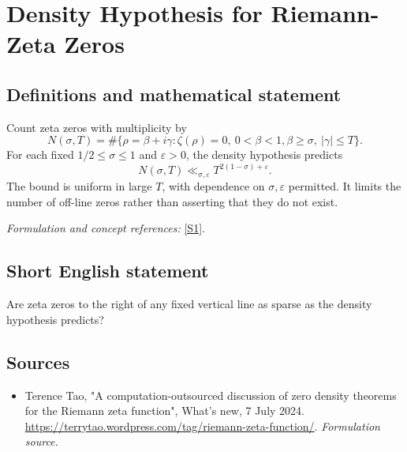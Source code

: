\documentclass[11pt]{article}
\begin{document}
\section*{\texorpdfstring{Density Hypothesis for Riemann-Zeta Zeros}{Density Hypothesis for Riemann-Zeta Zeros}}\label{30005276}
\subsection{Definitions and mathematical statement}
Count zeta zeros with multiplicity by
\[
 N(\sigma,T)=\#\{\rho=\beta+i\gamma:\zeta(\rho)=0,\ 0<\beta<1,
                                  \beta\ge\sigma,\ |\gamma|\le T\}.
\]
For each fixed $1/2\le\sigma\le1$ and $\varepsilon>0$, the density hypothesis predicts
\[
 N(\sigma,T)\ll_{\sigma,\varepsilon}T^{2(1-\sigma)+\varepsilon}.
\]
The bound is uniform in large $T$, with dependence on $\sigma,\varepsilon$ permitted. It limits the number of off-line zeros rather than asserting that they do not exist.
\par\smallskip\textit{Formulation and concept references:} \href{https://terrytao.wordpress.com/tag/riemann-zeta-function/}{[S1]}.

\subsection{Short English statement}
Are zeta zeros to the right of any fixed vertical line as sparse as the density hypothesis predicts?
\subsection{Sources}
\begin{itemize}
\item[S1]Terence Tao, "A computation-outsourced discussion of zero density theorems for the Riemann zeta function", What's new, 7 July 2024.
\url{https://terrytao.wordpress.com/tag/riemann-zeta-function/}.
\textit{Formulation source.}
\end{itemize}
\end{document}
